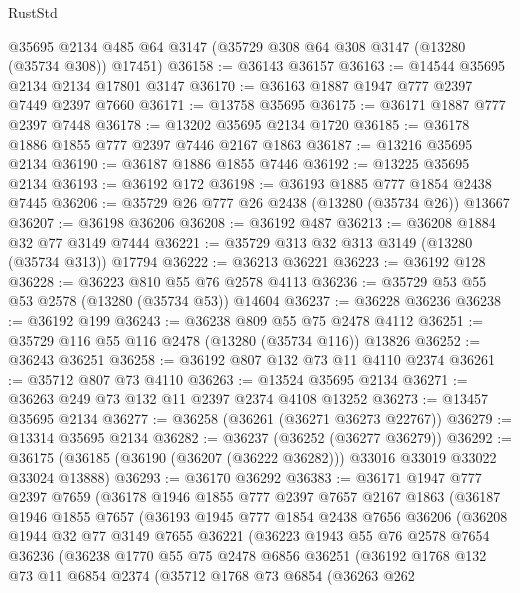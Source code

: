 \begin{lexlean}{RustStd}
\begin{coremodule}
    @35695
    @2134
    @485
    @64
    @3147
    (@35729 @308 @64 @308 @3147 (@13280 (@35734 @308)) @17451)
@36158 := @36143 @36157
@36163 := @14544 @35695 @2134 @2134 @17801 @3147
@36170 := @36163 @1887 @1947 @777 @2397 @7449 @2397 @7660
@36171 := @13758 @35695
@36175 := @36171 @1887 @777 @2397 @7448
@36178 := @13202 @35695 @2134 @1720
@36185 := @36178 @1886 @1855 @777 @2397 @7446 @2167 @1863
@36187 := @13216 @35695 @2134
@36190 := @36187 @1886 @1855 @7446
@36192 := @13225 @35695 @2134
@36193 := @36192 @172
@36198 := @36193 @1885 @777 @1854 @2438 @7445
@36206 := @35729 @26 @777 @26 @2438 (@13280 (@35734 @26)) @13667
@36207 := @36198 @36206
@36208 := @36192 @487
@36213 := @36208 @1884 @32 @77 @3149 @7444
@36221 := @35729 @313 @32 @313 @3149 (@13280 (@35734 @313)) @17794
@36222 := @36213 @36221
@36223 := @36192 @128
@36228 := @36223 @810 @55 @76 @2578 @4113
@36236 := @35729 @53 @55 @53 @2578 (@13280 (@35734 @53)) @14604
@36237 := @36228 @36236
@36238 := @36192 @199
@36243 := @36238 @809 @55 @75 @2478 @4112
@36251 := @35729 @116 @55 @116 @2478 (@13280 (@35734 @116)) @13826
@36252 := @36243 @36251
@36258 := @36192 @807 @132 @73 @11 @4110 @2374
@36261 := @35712 @807 @73 @4110
@36263 := @13524 @35695 @2134
@36271 := @36263 @249 @73 @132 @11 @2397 @2374 @4108 @13252
@36273 := @13457 @35695 @2134
@36277 := @36258 (@36261 (@36271 @36273 @22767))
@36279 := @13314 @35695 @2134
@36282 := @36237 (@36252 (@36277 @36279))
@36292 := @36175 (@36185 (@36190 (@36207 (@36222 @36282))) @33016 @33019 @33022 @33024 @13888)
@36293 := @36170 @36292
@36383 := @36171
    @1947
    @777
    @2397
    @7659
    (@36178
      @1946
      @1855
      @777
      @2397
      @7657
      @2167
      @1863
      (@36187
        @1946
        @1855
        @7657
        (@36193
          @1945
          @777
          @1854
          @2438
          @7656
          @36206
          (@36208
            @1944
            @32
            @77
            @3149
            @7655
            @36221
            (@36223
              @1943
              @55
              @76
              @2578
              @7654
              @36236
              (@36238
                @1770
                @55
                @75
                @2478
                @6856
                @36251
                (@36192
                  @1768
                  @132
                  @73
                  @11
                  @6854
                  @2374
                  (@35712
                    @1768
                    @73
                    @6854
                    (@36263
                      @262

\end{coremodule}
\end{lexlean}

